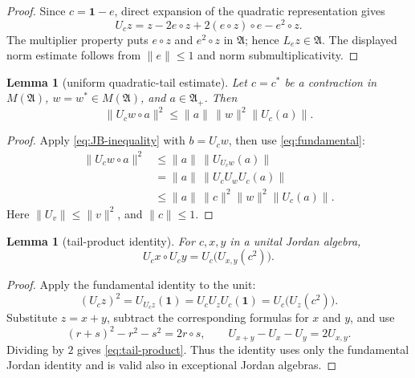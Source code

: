 \documentclass[11pt]{article}
\newtheorem{lemma}[theorem]{Lemma}
\newcommand{\A}{\mathfrak A}
\newcommand{\M}{M(\mathfrak A)}
\newcommand{\one}{\mathbf 1}
\begin{document}
\begin{proof}
Since \(c=\one-e\), direct expansion of the quadratic representation gives
\[
 U_cz=z-2e\circ z+2(e\circ z)\circ e-e^2\circ z.
\]
The multiplier property puts \(e\circ z\) and \(e^2\circ z\) in \(\A\);
hence \(L_ez\in\A\). The displayed norm estimate follows from
\(\lVert e\rVert\leq1\) and norm submultiplicativity.
\end{proof}

\begin{lemma}[uniform quadratic-tail estimate]\label{lem:tail}
Let \(c=c^*\) be a contraction in \(\M\), \(w=w^*\in\M\), and
\(a\in\A_+\). Then
\begin{equation}\label{eq:tail-estimate}
 \lVert U_cw\circ a\rVert^2
 \leq\lVert a\rVert\,\lVert w\rVert^2\lVert U_c(a)\rVert.
\end{equation}
\end{lemma}

\begin{proof}
Apply \eqref{eq:JB-inequality} with \(b=U_cw\), then use
\eqref{eq:fundamental}:
\[
\begin{aligned}
\lVert U_cw\circ a\rVert^2
 &\leq\lVert a\rVert\,\lVert U_{U_cw}(a)\rVert\\
 &=\lVert a\rVert\,\lVert U_cU_wU_c(a)\rVert\\
 &\leq\lVert a\rVert\,\lVert c\rVert^2
       \lVert w\rVert^2\lVert U_c(a)\rVert.
\end{aligned}
\]
Here \(\lVert U_v\rVert\leq\lVert v\rVert^2\), and
\(\lVert c\rVert\leq1\).
\end{proof}

\begin{lemma}[tail-product identity]\label{lem:tail-product}
For \(c,x,y\) in a unital Jordan algebra,
\begin{equation}\label{eq:tail-product}
 U_cx\circ U_cy=U_c\bigl(U_{x,y}(c^2)\bigr).
\end{equation}
\end{lemma}

\begin{proof}
Apply the fundamental identity to the unit:
\[
 (U_cz)^2=U_{U_cz}(\one)=U_cU_zU_c(\one)=U_c\bigl(U_z(c^2)\bigr).
\]
Substitute \(z=x+y\), subtract the corresponding formulas for \(x\) and
\(y\), and use
\[
 (r+s)^2-r^2-s^2=2r\circ s,\qquad
 U_{x+y}-U_x-U_y=2U_{x,y}.
\]
Dividing by \(2\) gives \eqref{eq:tail-product}. Thus the identity uses only
the fundamental Jordan identity and is valid also in exceptional Jordan
algebras.
\end{proof}
\end{document}
